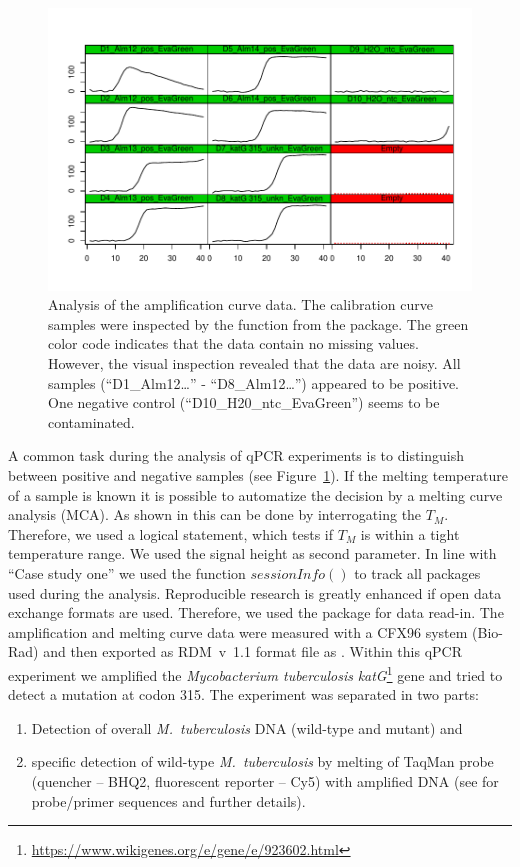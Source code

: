 \begin{figure}[htbp]
  \centering
  \includegraphics[clip=true, width=14cm]{figures/plotCurves.pdf}
  \caption{Analysis of the amplification curve data. The calibration curve 
samples were inspected by the  function from the 
 package. The green color code indicates that the data contain 
no missing values. However, the visual inspection revealed that the data are 
noisy. All samples (``D1\_Alm12\ldots'' - ``D8\_Alm12\ldots'') appeared to be 
positive. One negative control (``D10\_H20\_ntc\_EvaGreen'') seems to be 
contaminated.}
  \label{figure:plotCurves}
\end{figure}


A common task during the analysis of qPCR experiments is to distinguish between 
positive and negative samples (see Figure~\ref{figure:plotCurves}). If the 
melting temperature of a sample is known it is possible to automatize the 
decision by a melting curve analysis (MCA). As shown in 
\citet{roediger_RJ_2013} 
this can be done by interrogating the $T_{M}$. Therefore, we used a logical 
statement, which tests if $T_{M}$ is within a tight temperature range. We used 
the signal height as second parameter. In line with ``Case study one'' we used 
the function $sessionInfo()$ to track all packages used during the analysis. 
Reproducible research is greatly enhanced if open data exchange formats are 
used. Therefore, we used the  package for data read-in. The 
amplification and melting curve data were measured with a CFX96 system 
(Bio-Rad) 
and then exported as RDM~v~1.1 format file as . 
Within this qPCR experiment we amplified the \textit{Mycobacterium 
tuberculosis} 
\textit{katG}\footnote{\url{https://www.wikigenes.org/e/gene/e/923602.html}} 
gene and tried to detect a mutation at codon 315. The experiment was separated 
in two parts: 
\begin{enumerate}
 \item Detection of overall \textit{M.~tuberculosis} DNA (wild-type 
and mutant) and
 \item specific detection of wild-type \textit{M.~tuberculosis} by melting of 
TaqMan probe (quencher -- BHQ2, fluorescent reporter -- Cy5) with amplified DNA 
(see \citet{luo_multiplex_2011} for probe/primer sequences and further details).
\end{enumerate}


